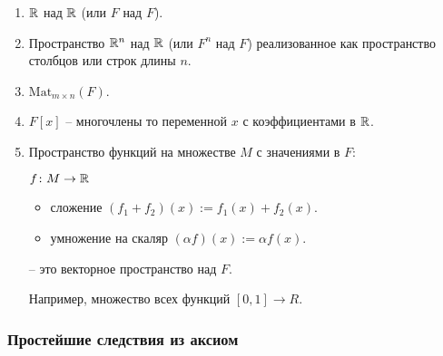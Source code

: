 \begin{example}
    \begin{enumerate}~
    \item $\mathbb{R}$ над $\mathbb{R}$ (или $F$ над $F$).
    \item Пространство $\mathbb{R}^n$ над $\mathbb{R}$ (или $F^n$ над $F$) реализованное как пространство столбцов или строк длины $n$.
    \item $\text{Mat}_{m \times n}(F)$.
    \item $F[x]$ -- многочлены то переменной $x$ с коэффициентами в $\mathbb{R}$.
    \item Пространство функций на множестве $M$ с значениями в $F$:

        $f\colon M \rightarrow \mathbb{R}$

        \begin{itemize}[nosep]
        \item сложение $(f_1 + f_2)(x) := f_1(x) + f_2(x)$.
        \item умножение на скаляр $(\alpha f)(x) := \alpha f(x)$.
        \end{itemize}

        -- это векторное пространство над $F$.

        Например, множество всех функций $[0, 1] \to R$.
    \end{enumerate}
\end{example}


\subsubsection{Простейшие следствия из аксиом}


